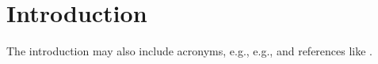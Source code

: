 \chapter{Introduction}
\label{chap:Introduction}

The introduction may also include acronyms, e.g., \ac{e.g.}, and references like \cite{ni_esim_2017}.
